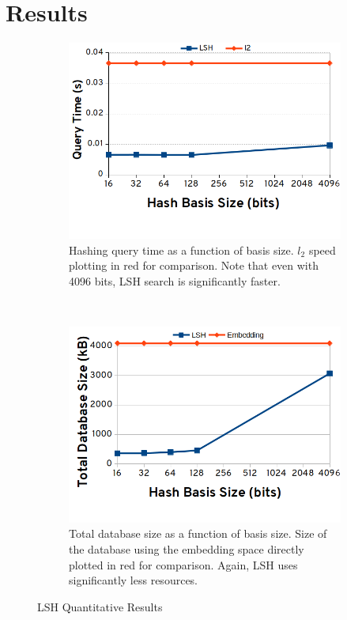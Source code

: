 \section{Results}\label{sec:results}

\begin{figure}[t]
    \centering
    \begin{subfigure}[b]{0.23\textwidth}
        \includegraphics[width=\textwidth]{images/hashing_time_results.png}
        \caption{Hashing query time as a function of basis size. $l_2$ speed plotting in red for comparison. Note that even with 4096 bits, LSH search is significantly faster.}
        \label{fig:gull}
    \end{subfigure} 
    ~
    \begin{subfigure}[b]{0.23\textwidth}
        \includegraphics[width=\textwidth]{images/hashing_memory_results.png}
        \caption{Total database size as a function of basis size. Size of the database using the embedding space directly plotted in red for comparison. Again, LSH uses significantly less resources.}
        \label{fig:tiger}
    \end{subfigure}
    \caption{LSH Quantitative Results}
    \label{fig:lshres}
\end{figure}

